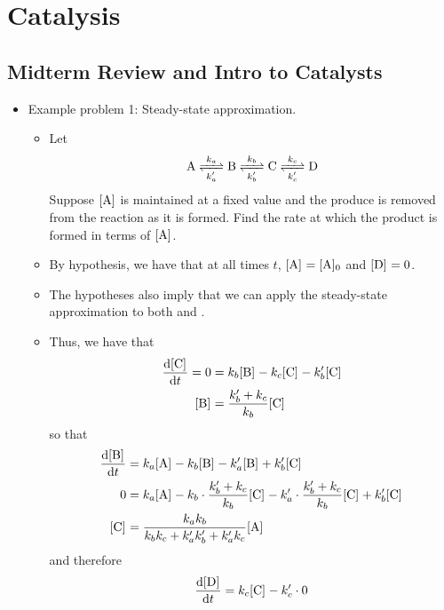 \documentclass[../notes.tex]{subfiles}
\begin{document}
\chapter{Catalysis}
\section{Midterm Review and Intro to Catalysts}
\begin{itemize}
    \item {}Example problem 1: Steady-state approximation.
    \begin{itemize}
        \item Let
        \begin{equation*}
            \ce{A <=>[$k_a$][$k_a'$] B <=>[$k_b$][$k_b'$] C <=>[$k_c$][$k_c'$] D}
        \end{equation*}
        Suppose $\cnc{A}$ is maintained at a fixed value and the produce  is removed from the reaction as it is formed. Find the rate at which the product is formed in terms of $\cnc{A}$.
        \item By hypothesis, we have that at all times $t$, $\cnc{A}=\cnc[0]{A}$ and $\cnc{D}=0$.
        \item The hypotheses also imply that we can apply the steady-state approximation to both  and .
        \item Thus, we have that
        \begin{align*}
            \dv{\cnc{C}}{t} = 0 &= k_b\cnc{B}-k_c\cnc{C}-k_b'\cnc{C}\\
            \cnc{B} &= \frac{k_b'+k_c}{k_b}\cnc{C}
        \end{align*}
        so that
        \begin{align*}
            \dv{\cnc{B}}{t} &= k_a\cnc{A}-k_b\cnc{B}-k_a'\cnc{B}+k_b'\cnc{C}\\
            0 &= k_a\cnc{A}-k_b\cdot\frac{k_b'+k_c}{k_b}\cnc{C}-k_a'\cdot\frac{k_b'+k_c}{k_b}\cnc{C}+k_b'\cnc{C}\\
            \cnc{C} &= \frac{k_ak_b}{k_bk_c+k_a'k_b'+k_a'k_c}\cnc{A}
        \end{align*}
        and therefore
        \begin{align*}
            \dv{\cnc{D}}{t} &= k_c\cnc{C}-k_c'\cdot 0\\

\end{align*}
\end{itemize}
\end{itemize}
\end{document}
